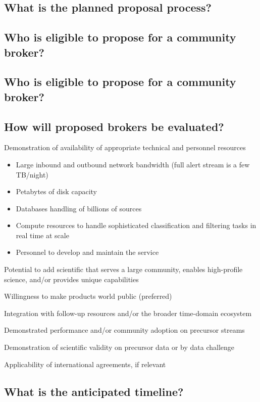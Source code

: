 \subsection{What is the planned proposal process?}

\subsection{Who is eligible to propose for a community broker?}

\subsection{Who is eligible to propose for a community broker?}

\subsection{How will proposed brokers be evaluated?}

Demonstration of availability of appropriate technical and personnel resources
\begin{itemize}
	\item Large inbound and outbound network bandwidth (full alert stream is a few TB/night)
	\item Petabytes of disk capacity
	\item Databases handling of billions of sources
	\item Compute resources to handle sophisticated classification and filtering tasks in real time at scale
	\item Personnel to develop and maintain the service
\end{itemize}


Potential to add scientific that serves a large community, enables high-profile science, and/or provides unique capabilities

Willingness to make products world public (preferred)

Integration with follow-up resources and/or the broader time-domain ecosystem

Demonstrated performance and/or community adoption on precursor streams

Demonstration of scientific validity on precursor data or by data challenge

Applicability of international agreements, if relevant


\subsection{What is the anticipated timeline?}

